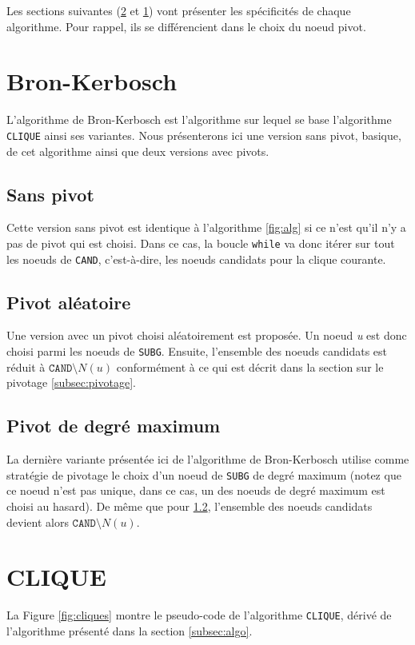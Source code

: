 \documentclass[12pt,a4paper]{article}
\begin{document}
Les sections suivantes (\ref{sec:clique} et \ref{sec:bk1}) vont présenter les spécificités de chaque algorithme. Pour rappel, ils se différencient dans le choix du noeud pivot.

\section{Bron-Kerbosch}%
\label{sec:bk1}

L'algorithme de Bron-Kerbosch est l'algorithme sur lequel se base l'algorithme \texttt{CLIQUE} ainsi ses variantes. Nous présenterons ici une version sans pivot, basique, de cet algorithme ainsi que deux versions avec pivots.

\subsection{Sans pivot}%
\label{subsec:bk}
Cette version sans pivot est identique à l'algorithme \ref{fig:alg} si ce n'est qu'il n'y a pas de pivot qui est choisi. Dans ce cas, la boucle \texttt{while} va donc itérer sur tout les noeuds de \texttt{CAND}, c'est-à-dire, les noeuds candidats pour la clique courante.

\subsection{Pivot aléatoire}%
\label{subsec:random}
Une version avec un pivot choisi aléatoirement est proposée. Un noeud \emph{u} est donc choisi parmi les noeuds de \texttt{SUBG}. Ensuite, l'ensemble des noeuds candidats est réduit à \(\texttt{CAND} \setminus N(u)\) conformément à ce qui est décrit dans la section sur le pivotage \ref{subsec:pivotage}.

\subsection{Pivot de degré maximum}%
\label{subsec:max}
La dernière variante présentée ici de l'algorithme de Bron-Kerbosch utilise comme stratégie de pivotage le choix d'un noeud de \texttt{SUBG} de degré maximum (notez que ce noeud n'est pas unique, dans ce cas, un des noeuds de degré maximum est choisi au hasard). De même que pour \ref{subsec:random}, l'ensemble des noeuds candidats devient alors \(\texttt{CAND} \setminus N(u)\).


\section{CLIQUE}
\label{sec:clique}
La Figure \ref{fig:cliques} montre le pseudo-code de l'algorithme \texttt{CLIQUE}, dérivé de l'algorithme présenté dans la section \ref{subsec:algo}.
\end{document}
